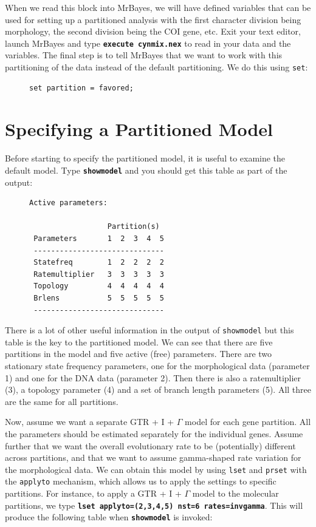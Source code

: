 \documentclass[12pt]{book}
\newcommand{\ttt}[1]{\texttt{#1}}
\newcommand{\tb}[1]{\ttt{\textbf{#1}}}
\begin{document}
When we read this block into MrBayes, we will have defined variables that can be used for setting
up a partitioned analysis with the first character division being morphology, the second division
being the COI gene, etc. Exit your text editor, launch MrBayes and type \tb{execute cynmix.nex} to
read in your data and the variables. The final step is to tell MrBayes that we want to work with
this partitioning of the data instead of the default partitioning. We do this using \texttt{set}:

\begin{figure}[h]
\begin{BVerbatim}
set partition = favored;
\end{BVerbatim}
\end{figure}

\section{Specifying a Partitioned Model}

Before starting to specify the partitioned model, it is useful to examine the default model. Type
\tb{showmodel} and you should get this table as part of the output: 

\begin{figure}[h]
\centering
\begin{BVerbatim}
Active parameters:

                  Partition(s)
 Parameters       1  2  3  4  5
 ------------------------------
 Statefreq        1  2  2  2  2
 Ratemultiplier   3  3  3  3  3
 Topology         4  4  4  4  4
 Brlens           5  5  5  5  5
 ------------------------------
\end{BVerbatim}
\end{figure}

There is a lot of other useful information in the output of \texttt{showmodel} but this table is
the key to the partitioned model. We can see that there are five partitions in the model and five
active (free) parameters. There are two stationary state frequency parameters, one for the
morphological data (parameter 1) and one for the DNA data (parameter 2). Then there is also a
ratemultiplier (3), a topology parameter (4) and a set of branch length parameters (5). All three
are the same for all partitions.

Now, assume we want a separate GTR + I + $\Gamma$ model for each gene partition. All the parameters
should be estimated separately for the individual genes. Assume further that we want the overall
evolutionary rate to be (potentially) different across partitions, and that we want to assume
gamma-shaped rate variation for the morphological data. We can obtain this model by using
\texttt{lset} and \texttt{prset} with the \texttt{applyto} mechanism, which allows us to apply the
settings to specific partitions. For instance, to apply a GTR + I + $\Gamma$ model to the molecular
partitions, we type \tb{lset applyto=(2,3,4,5) nst=6 rates=invgamma}. This will produce the
following table when \tb{showmodel} is invoked:
\end{document}
